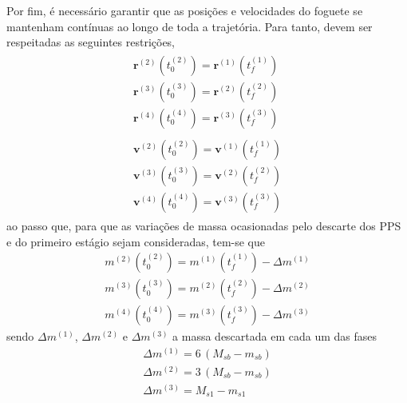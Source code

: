 Por fim, é necessário garantir que as posições e velocidades do foguete se mantenham contínuas ao longo de toda a trajetória. Para tanto, devem ser respeitadas as seguintes restrições,
%
\begin{gather}
\label{eq:foguete:rContinua}
\begin{gathered}
\mathbf{r}^{(2)} \left( t_0^{(2)} \right) = \mathbf{r}^{(1)} \left( t_f^{(1)} \right) \\
\mathbf{r}^{(3)} \left( t_0^{(3)} \right) = \mathbf{r}^{(2)} \left( t_f^{(2)} \right) \\
\mathbf{r}^{(4)} \left( t_0^{(4)} \right) = \mathbf{r}^{(3)} \left( t_f^{(3)} \right) 
\end{gathered} \\
\label{eq:foguete:vContinua}
\begin{gathered}
\mathbf{v}^{(2)} \left( t_0^{(2)} \right) = \mathbf{v}^{(1)} \left( t_f^{(1)} \right) \\
\mathbf{v}^{(3)} \left( t_0^{(3)} \right) = \mathbf{v}^{(2)} \left( t_f^{(2)} \right) \\
\mathbf{v}^{(4)} \left( t_0^{(4)} \right) = \mathbf{v}^{(3)} \left( t_f^{(3)} \right) 
\end{gathered}
\end{gather}
%
ao passo que, para que as variações de massa ocasionadas pelo descarte dos PPS e do primeiro estágio sejam consideradas, tem-se que
%
\begin{equation}
	\begin{gathered}
		m^{(2)} \left( t_0^{(2)} \right)  = m^{(1)} \left( t_f^{(1)} \right) - \Delta m^{(1)} \\
		m^{(3)} \left( t_0^{(3)} \right)  = m^{(2)} \left( t_f^{(2)} \right) - \Delta m^{(2)} \\
		m^{(4)} \left( t_0^{(4)} \right)  = m^{(3)} \left( t_f^{(3)} \right) - \Delta m^{(3)} 			
	\end{gathered}
\end{equation}
%
sendo $ \Delta m^{(1)} $, $ \Delta m^{(2)} $ e $ \Delta m^{(3)} $ a massa descartada em cada um das fases
%
\begin{equation}
	\begin{gathered}
		\Delta m^{(1)} = 6 \, (M_{sb} - m_{sb}) \\
		\Delta m^{(2)} = 3 \, (M_{sb} - m_{sb}) \\
		\Delta m^{(3)} = M_{s1} - m_{s1}
	\end{gathered}
\end{equation}

